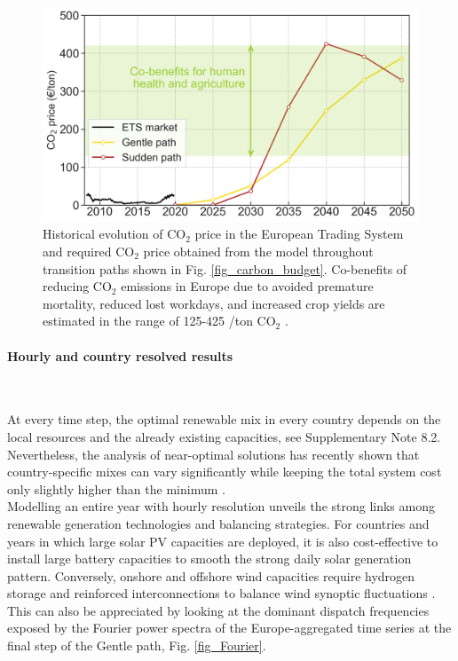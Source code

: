 \documentclass[5p]{elsarticle} %
\begin{document}
\begin{figure}[!h]
\centering
\includegraphics[width=\columnwidth]{figures/co2_price.png}
\caption{Historical evolution of CO$_2$ price in the European Trading System \cite{ETS} and required CO$_2$ price obtained from the model throughout transition paths shown in Fig. \ref{fig_carbon_budget}. 
Co-benefits of reducing CO$_2$ emissions in Europe due to avoided premature mortality, reduced lost workdays, and increased crop yields are estimated in the range of 125-425 \EUR/ton CO$_2$ \cite{Vandyck_2018}.} \label{fig_co2price} 
\end{figure}

\paragraph{\textbf{Hourly and country resolved results}} \

At every time step, the optimal renewable mix in every country depends on the local resources and the already existing capacities, see Supplementary Note 8.2. Nevertheless, the analysis of near-optimal solutions has recently shown that country-specific mixes can vary significantly while keeping the total system cost only slightly higher than the minimum \cite{Neumann_2019}. \\

Modelling an entire year with hourly resolution unveils the strong links among renewable generation technologies and balancing strategies. For countries and years in which large solar PV capacities are deployed, it is also cost-effective to install large battery capacities to smooth the strong daily solar generation pattern. Conversely, onshore and offshore wind capacities require hydrogen storage and reinforced interconnections to balance wind synoptic fluctuations \cite{Rasmussen_2012, Schlachtberger_2017, Victoria_2019_storage}. %
This can also be appreciated by looking at the dominant dispatch frequencies exposed by the Fourier power spectra of the Europe-aggregated time series at the final step of the Gentle path, Fig. \ref{fig_Fourier}. \\
\end{document}
